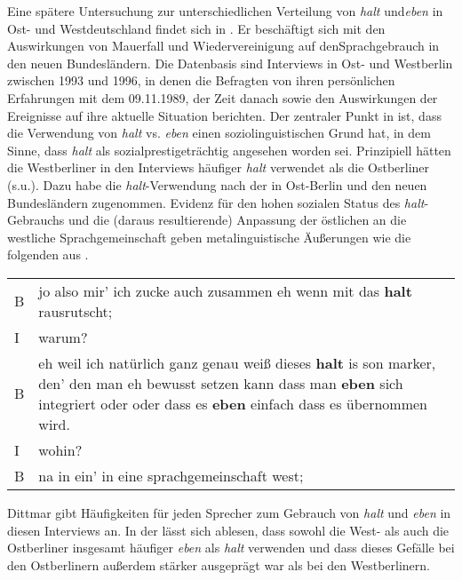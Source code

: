 Eine spätere Untersuchung zur unterschiedlichen Verteilung von \textit{halt} und\linebreak \textit{eben} in Ost- und Westdeutschland findet sich in \citet{Dittmar2000}. Er beschäftigt sich mit den Auswirkungen von Mauerfall und Wiedervereinigung auf den\linebreak Sprachgebrauch in den neuen Bundesländern. Die Datenbasis sind Interviews in Ost- und Westberlin zwischen 1993 und 1996, in denen die Befragten von ihren persönlichen Erfahrungen mit dem 09.11.1989, der Zeit danach sowie den Auswirkungen der Ereignisse auf ihre aktuelle Situation berichten. Der zentraler Punkt in \citet[213]{Dittmar2000} ist, dass die Verwendung von \textit{halt} vs. \textit{eben} einen soziolinguistischen Grund hat, in dem Sinne, dass \textit{halt} als sozialprestigeträchtig angesehen worden sei. Prinzipiell hätten die Westberliner in den Interviews häufiger \textit{halt} verwendet als die Ostberliner (s.u.). Dazu habe die \textit{halt}-Verwendung nach der  in Ost-Berlin und den neuen Bundesländern zugenommen. Evidenz für den hohen sozialen Status des \textit{halt}-Gebrauchs und die (daraus resultierende) Anpassung der östlichen an die westliche Sprachgemeinschaft geben metalinguistische Äußerungen wie die folgenden aus \citet[230]{Dittmar2000}.
\begin{exe}
	\ex\label{540} 
		\begin{tabularx}{\linewidth}[t]{lX} 
 		B & jo also mir' ich zucke auch zusammen eh wenn mit das \textbf{halt} rausrutscht;\\   
 		I & warum? \\
 		B & eh weil ich natürlich ganz genau weiß dieses \textbf{halt} is son marker, den' 
 		den man eh bewusst setzen kann dass man \textbf{eben} sich integriert oder 
 		oder dass es \textbf{eben} einfach dass es übernommen wird. \\
 		I & wohin? \\
 		B &	na in ein' in eine sprachgemeinschaft west;	
  		\end{tabularx}				
\end{exe}																	
Dittmar gibt Häufigkeiten für jeden Sprecher zum Gebrauch von \textit{halt} und \textit{eben} in diesen Interviews an. In der  lässt sich ablesen, dass sowohl die West- als auch die Ostberliner insgesamt häufiger \textit{eben} als \textit{halt} verwenden und dass dieses Gefälle bei den Ostberlinern außerdem stärker ausgeprägt war als bei den Westberlinern.

